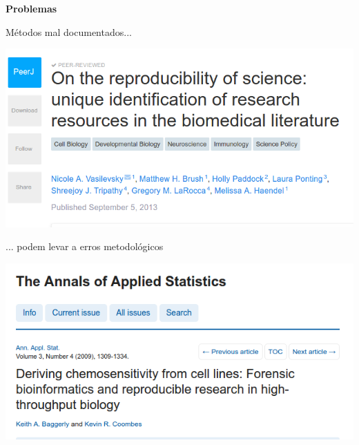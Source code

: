 \documentclass{beamer}
\begin{document}
\begin{frame}
  \begin{center}
    {\bf Problemas}
  \end{center}
\end{frame}

\begin{frame}{Métodos mal documentados...}
  \begin{center}
    \includegraphics[width=\textwidth]{Imagens/Vasilevsky}

  \end{center}
\end{frame}

\begin{frame}{... podem levar a erros metodológicos}
  \begin{center}
    \includegraphics[width=\textwidth]{Imagens/Baggerly}
  \end{center}
\end{frame}
\end{document}
